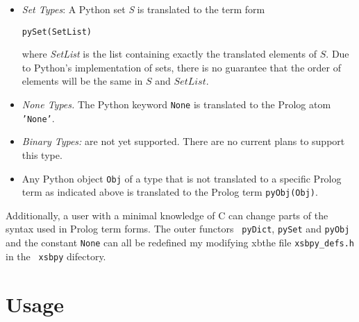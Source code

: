 \begin{itemize}
         {\tt pyDict(DictList)}

         where {\tt DictList} is a list of tuples in term form: 

         {\tt ''(Key,Value)}

         {\tt Key} and {\tt Value} are the translations of any Python
         data structures that are both allowable as a dictionary key
         or value, and supported by {\tt xsbpy}.  For instance, {\tt
           Value} can be (the term form of) a list, a set, a tuple or
         another dictionary.

       \item {\em Set Types}: A Python set {\em S} is translated to
         the term form

         {\tt pySet(SetList)}

         where {\em SetList} is the list containing exactly the
         translated elements of $S$.  Due to Python's implementation
         of sets, there is no guarantee that the order of elements
         will be the same in $S$ and $SetList$.
       \item {\em None Types.} The Python keyword {\tt None} is
         translated to the Prolog atom {\tt 'None'}. 
       \item {\em Binary Types:} are not yet supported.  There are no
         current plans to support this type.
     \item Any Python object {\tt Obj} of a type that is not
       translated to a specific Prolog term as indicated above is
       translated to the Prolog term {\tt pyObj(Obj)}. 
\end{itemize}

Additionally, a user with a minimal knowledge of C can change parts of
the syntax used in Prolog term forms.  The outer functors {\tt
  pyDict}, {\tt pySet} and {\tt pyObj} and the constant {\tt None} can
all be redefined my modifying xbthe file {\tt xsbpy\_defs.h} in the {\tt
  xsbpy} difectory.

\section{Usage}

